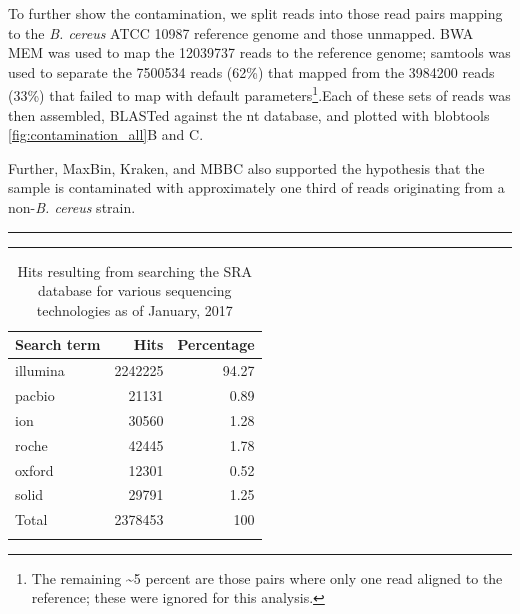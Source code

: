 \documentclass[10pt]{article}
\def \thoughtbr {\begin{center}\noindent\rule{.4\textwidth}{0.4pt}  {\raisebox{-.5ex}{$\sim$}}  \rule{.4\textwidth}{0.4pt}\end{center}}
\def \ttilde {\raisebox{-.5ex}\textasciitilde} %
\begin{document}
To further show the contamination, we split reads into those read pairs mapping to the \textit{B. cereus} ATCC 10987 reference genome and those unmapped.  BWA MEM\cite{Li2013} was used to map the 12039737 reads to the reference genome;  samtools was used to separate the 7500534 reads (62\%) that mapped from the 3984200 reads (33\%) that failed to map with default parameters\footnote{The remaining \ttilde5 percent are those pairs where only one read aligned to the reference; these were ignored for this analysis.}.Each of these sets of reads was then assembled, BLASTed against the nt database, and plotted with blobtools \ref{fig:contamination_all}B and C.


Further, MaxBin\cite{Wu2014}, Kraken, and MBBC\cite{Wang2011} also supported the hypothesis that the sample is contaminated with approximately one third of reads originating from a non-\textit{B. cereus} strain.


\thoughtbr
\newpage

\begin{table}[]
  \centering
  \caption{Hits resulting from searching the SRA database for various sequencing technologies as of January, 2017}
  \label{table:searchterms}
  \begin{tabular}{lrr}
    \toprule
    Search term & Hits & Percentage \\
    \midrule
    illumina & 2242225 & 94.27 \\
    pacbio & 21131 & 0.89 \\
    ion & 30560 & 1.28 \\
    roche & 42445 & 1.78 \\
    oxford & 12301 & 0.52 \\
    solid & 29791 & 1.25 \\
    \arrayrulecolor{lgray}\hline
    Total & 2378453 & 100\\
    \arrayrulecolor{black}
    \bottomrule
\end{tabular}
\end{table}
\end{document}
